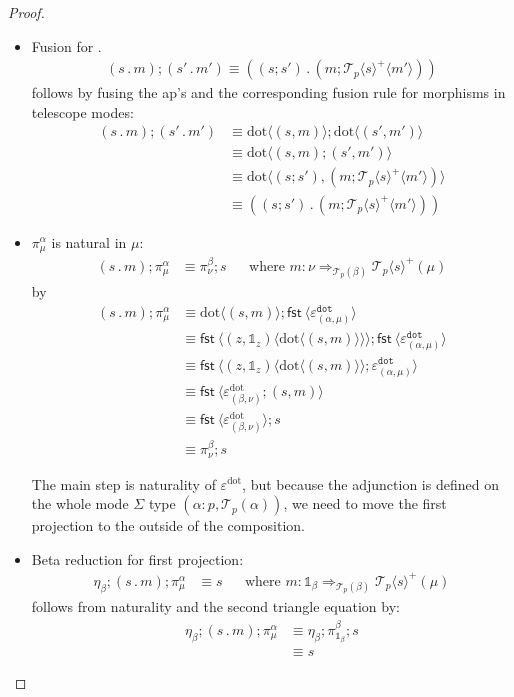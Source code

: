 \documentclass[10pt]{article}
\theoremstyle{definition}
\newcommand\dsd[1]{\ensuremath{\mathsf{#1}}}
\newcommand{\tcell}{\Rightarrow}
\newcommand{\app}[2]{\ensuremath{#1 \: #2}}
\newcommand{\sigmacl}[3]{\ensuremath{(#1{:}#2,#3)}}
\newcommand{\fst}[1]{\app{\dsd{fst}}{#1}}
\newcommand\TrPlus[2]{\ensuremath{{#1}^+(#2)}}
\newcommand\El[2]{\mathcal{T}_{#1}(#2)}
\newcommand\ApEl[2]{\mathcal{T}_{#1}\langle#2\rangle}
\newcommand\bdot[0]{\mathbin{.}}
\newcommand\ap[2]{\ensuremath{#1 \langle #2 \rangle }}
\newcommand\ApPlus[2]{\ensuremath{{#1}^+ \langle #2 \rangle }}
\newcommand{\tdot}{\ensuremath{\mathtt{dot}}}
\newcommand{\sdot}{\ensuremath{\mathrm{dot}}}
\newcommand\One{\ensuremath{\mathds{1}}}
\begin{document}
\begin{proof}~
\begin{itemize}
\item Fusion for $.$
\begin{align}
\label{dot-fusion}
    (s \bdot m);(s' \bdot m') \equiv ((s;s') \bdot (m;\ApPlus{\ApEl{p}{s}} {m'}))
\end{align}
follows by fusing the ap's and the corresponding fusion rule for morphisms in telescope modes:
\begin{align*}
(s \bdot m);(s' \bdot m') &\equiv \ap{\sdot}{(s, m)} ; \ap{\sdot}{(s', m')} \\
&\equiv \ap{\sdot}{(s, m);(s', m')} \\
&\equiv \ap{\sdot}{(s;s'), (m;\ApPlus{\ApEl{p}{s}} {m'})} \\
&\equiv ((s;s') \bdot (m;\ApPlus{\ApEl{p}{s}} {m'}))
\end{align*}

\item $\pi^\alpha_\mu$ is natural in $\mu$:
  \begin{align}
  \label{pi-naturality}
  (s \bdot m); \pi^\alpha_\mu &\equiv \pi^\beta_\nu;s && \text{where }
  {m} : {\nu} \tcell_{\El{p}{\beta}} {\TrPlus{\ApEl{p}{s}}{\mu}}
  \end{align}
  by
  \begin{align*}
  (s \bdot m); \pi^\alpha_\mu 
  &\equiv \ap{\sdot}{(s, m)} ; \ap \fst {\varepsilon^\tdot_{(\alpha, \mu)}} \\  
  &\equiv \ap{\fst}{\ap{(z,\One_z)}{\ap{\sdot}{(s, m)}}} ; \ap \fst {\varepsilon^\tdot_{(\alpha, \mu)}} \\
  &\equiv \ap{\fst}{\ap{(z,\One_z)}{\ap{\sdot}{(s, m)}} ; \varepsilon^\tdot_{(\alpha, \mu)}}  \\
  &\equiv \ap{\fst}{\varepsilon^\sdot_{(\beta, \nu)}; (s, m) } \\
  &\equiv \ap{\fst}{\varepsilon^\sdot_{(\beta, \nu)}} ; s\\
  &\equiv \pi^\beta_\nu ; s
  \end{align*}

The main step is naturality of $\varepsilon^\sdot$, but because the adjunction
is defined on the whole mode $\Sigma$ type \sigmacl{\alpha}{p}{\El p
  \alpha}, we need to move the first projection to the outside of the
composition.
  
\item Beta reduction for first projection:
  \begin{align}
\label{beta-pi}
\eta_\beta;(s \bdot m);\pi^\alpha_\mu &\equiv s && \text{where } {m} : {\One_\beta} \tcell_{\El p \beta} {\TrPlus{\ApEl{p}{s}}{\mu}}
  \end{align}
follows from naturality and the second triangle equation by:
\begin{align*}
\eta_\beta;(s \bdot m);\pi^\alpha_\mu
&\equiv \eta_\beta;\pi^\beta_{\One_\beta};s \\
&\equiv s
\end{align*}


\end{itemize}
\end{proof}
\end{document}
